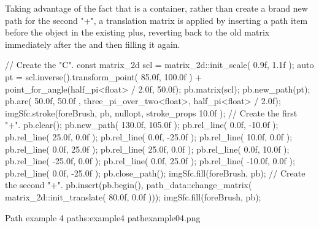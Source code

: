 \pnum
Taking advantage of the fact that  is a container, rather than create a brand new path for the second "+", a translation matrix is applied by inserting a  path item before the  object in the existing plus, reverting back to the old matrix immediately after the  and then filling it again.

\begin{codeblock}
// Create the "C".
const matrix_2d scl = matrix_2d::init_scale({ 0.9f, 1.1f });
auto pt = scl.inverse().transform_point({ 85.0f, 100.0f }) +
  point_for_angle(half_pi<float> / 2.0f, 50.0f);
pb.matrix(scl);
pb.new_path(pt);
pb.arc({ 50.0f, 50.0f }, three_pi_over_two<float>, half_pi<float> / 2.0f);
imgSfc.stroke(foreBrush, pb, nullopt, stroke_props{ 10.0f });
// Create the first "+".
pb.clear();
pb.new_path({ 130.0f, 105.0f });
pb.rel_line({ 0.0f, -10.0f });
pb.rel_line({ 25.0f, 0.0f });
pb.rel_line({ 0.0f, -25.0f });
pb.rel_line({ 10.0f, 0.0f });
pb.rel_line({ 0.0f, 25.0f });
pb.rel_line({ 25.0f, 0.0f });
pb.rel_line({ 0.0f, 10.0f });
pb.rel_line({ -25.0f, 0.0f });
pb.rel_line({ 0.0f, 25.0f });
pb.rel_line({ -10.0f, 0.0f });
pb.rel_line({ 0.0f, -25.0f });
pb.close_path();
imgSfc.fill(foreBrush, pb);
// Create the second "+".
pb.insert(pb.begin(), path_data::change_matrix(
  matrix_2d::init_translate({ 80.0f, 0.0f })));
imgSfc.fill(foreBrush, pb);
\end{codeblock}

\begin{importgraphiciotwod}
{Path example 4}
{paths:example4}
{pathexample04.png}
\end{importgraphiciotwod}

\FloatBarrier
%
%
%
%
%
%
